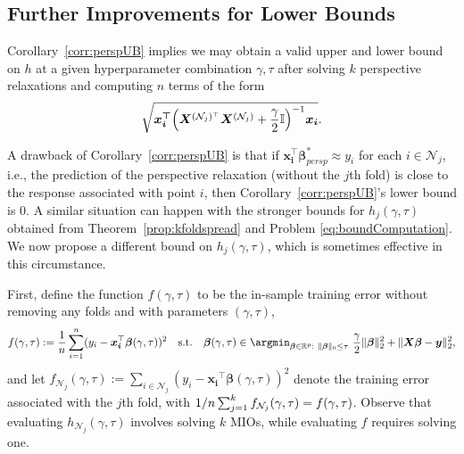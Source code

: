 \documentclass[ijoc,noblindrev]{informs3} %
\newcommand{\ag}[1]{{\color{black}#1}}
\begin{document}


\subsection{\ag{Further Improvements for Lower Bounds}}\label{sec:genBounds}

Corollary~\ref{corr:perspUB} implies we may obtain a valid upper and lower bound on $h$ at a given hyperparameter combination $\gamma, \tau$ after solving $k$ perspective relaxations and computing $n$ terms of the form $$\sqrt{\bm{x_i^\top}\ag{\left(\bm{X}^{(\mathcal{N}_j)^\top} \bm{X}^{(\mathcal{N}_j)}+\frac{\gamma}{2}\mathbb{I}\right)^{-1}}\bm{x_i}}.$$ %

A drawback of Corollary~\ref{corr:perspUB} is that if $\bm{x_i^\top}\bm{\beta}_{persp}^*\approx y_i$ for each $i \in \mathcal{N}_j$, i.e., the prediction of the perspective relaxation (without \ag{the $j$th fold}) is close to the response associated with point $i$, then Corollary~\ref{corr:perspUB}'s lower bound is $0$. \ag{A similar situation can happen with the stronger bounds for $h_j(\gamma,\tau)$ obtained from Theorem~\ref{prop:kfoldspread} and Problem \eqref{eq:boundComputation}.} We now propose a different bound on \ag{$h_j(\gamma,\tau)$}, which is sometimes effective in this circumstance.

First, define the function $f(\gamma,\tau)$ to be the in-sample training error \ag{without removing any folds and }with parameters $(\gamma, \tau)$,
\begin{equation*}
f(\gamma,\tau) := \frac{1}{n} \sum_{i=1}^n (y_i -\bm{x_i}^\top \bm{\beta}(\gamma, \tau))^2\quad
\text{s.t.} \quad  \bm{\beta}(\gamma, \tau) \in \argmin_{\bm{\beta} \in \mathbb{R}^p: \ \Vert \bm{\beta}\Vert_0 \leq \tau} \ \frac{\gamma}{2}\Vert \bm{\beta}\Vert_2^2 +\Vert \bm{X}\bm{\beta}-\bm{y}\Vert_2^2,
\end{equation*}
and let \ag{$f_{\mathcal{N}_j}(\gamma, \tau):=\sum_{i\in \mathcal{N}_j}\left(y_i -\bm{x_i}^\top \bm{\beta}(\gamma,\tau)\right)^2$} denote the training error \ag{associated with the $j$th fold}, with $\ag{1/n \sum_{j=1}^k f_{\mathcal{N}_j}(\gamma, \tau)}=f(\gamma, \tau)$. Observe that evaluating $h_{\mathcal{N}_j}(\gamma,\tau)$ involves solving \ag{$k$} MIOs, while evaluating $f$ requires solving one. 
\end{document}
